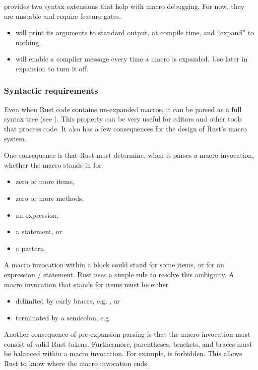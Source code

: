 \blank

 provides two syntax extensions that help with macro debugging. For now, they are unstable and require feature gates.

\begin{itemize}
  \item{ will print its arguments to standard output, at compile time, and \enquote{expand} to nothing.}
  \item{ will enable a compiler message every time a macro is expanded. Use  
      later in expansion to turn it off.}
\end{itemize}

\subsubsection*{Syntactic requirements}

Even when Rust code contains un-expanded macros, it can be parsed as a full syntax tree (see ). This 
property can be very useful for editors and other tools that process code. It also has a few consequences for the design of Rust's macro 
system.

\blank

One consequence is that Rust must determine, when it parses a macro invocation, whether the macro stands in for

\begin{itemize}
  \item{zero or more items,}
  \item{zero or more methods,}
  \item{an expression,}
  \item{a statement, or}
  \item{a pattern.}
\end{itemize}

A macro invocation within a block could stand for some items, or for an expression / statement. Rust uses a simple rule to resolve 
this ambiguity. A macro invocation that stands for items must be either

\begin{itemize}
  \item{delimited by curly braces, e.g. , or}
  \item{terminated by a semicolon, e.g. }
\end{itemize}

Another consequence of pre-expansion parsing is that the macro invocation must consist of valid Rust tokens. Furthermore, parentheses, 
brackets, and braces must be balanced within a macro invocation. For example, \code{foo!([)} is forbidden. This allows Rust to know 
where the macro invocation ends.

